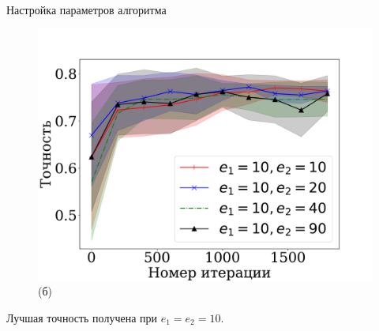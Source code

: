 \documentclass[12pt, aspectratio=169]{beamer}
\begin{document}
\begin{frame}{Настройка параметров алгоритма}
\begin{figure}
\begin{minipage}[h]{0.45\linewidth}
{    \includegraphics[width=\linewidth]{synth_period_rus.pdf}\\(б)}
    \end{minipage}
    
    
\end{figure}
    
    \fontsize{12}{8}\selectfont
    Лучшая точность получена при $e_1 = e_2=10$.
    
\end{frame}

    

\end{document}
